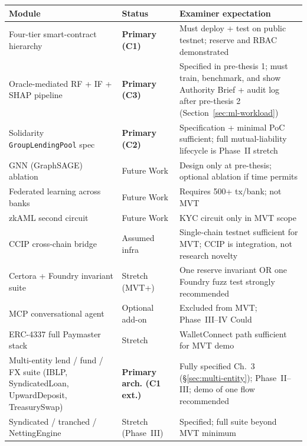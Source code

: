 \documentclass[12pt, a4paper]{report}
\newcommand{\tableheadcolor}{\rowcolor{TableHeadBg}}
\begin{document}
\begin{table}[H]
\centering
\begin{tabular}{p{4.2cm}p{2.2cm}p{7.8cm}}
\toprule
\tableheadcolor
\textbf{Module} & \textbf{Status} & \textbf{Examiner expectation} \\
\midrule
Four-tier smart-contract hierarchy & \textbf{Primary (C1)} & Must deploy + test on public testnet; reserve and RBAC demonstrated \\
Oracle-mediated RF + IF + SHAP pipeline & \textbf{Primary (C3)} & Specified in pre-thesis 1; must train, benchmark, and show Authority Brief + audit log after pre-thesis 2 (Section~\ref{sec:ml-workload}) \\
Solidarity \texttt{GroupLendingPool} spec & \textbf{Primary (C2)} & Specification + minimal PoC sufficient; full mutual-liability lifecycle is Phase~II stretch \\
GNN (GraphSAGE) ablation & Future Work & Design only at pre-thesis; optional ablation if time permits \\
Federated learning across banks & Future Work & Requires 500+ tx/bank; not MVT \\
zkAML second circuit & Future Work & KYC circuit only in MVT scope \\
CCIP cross-chain bridge & Assumed infra & Single-chain testnet sufficient for MVT; CCIP is integration, not research novelty \\
Certora + Foundry invariant suite & Stretch (MVT+) & One reserve invariant OR one Foundry fuzz test strongly recommended \\
MCP conversational agent & Optional add-on & Excluded from MVT; Phase~III--IV Could \\
ERC-4337 full Paymaster stack & Stretch & WalletConnect path sufficient for MVT demo \\
Multi-entity lend / fund / FX suite (IBLP, SyndicatedLoan, UpwardDeposit, TreasurySwap) & \textbf{Primary arch. (C1 ext.)} & Fully specified Ch.~3 (\S\ref{sec:multi-entity}); Phase~II--III; demo of one flow recommended \\
Syndicated / tranched / NettingEngine & Stretch (Phase~III) & Specified; full suite beyond MVT minimum \\
\bottomrule
\end{tabular}
\end{table}
\end{document}
